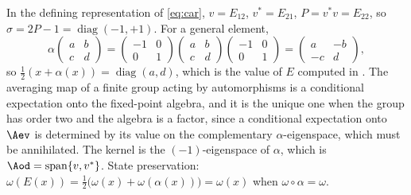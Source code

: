 In the defining representation of \eqref{eq:car}, $v = E_{12}$, $v^{*} = E_{21}$, $P = v^{*}v = E_{22}$, so $\sigma = 2P - 1 = \operatorname{diag}(-1, +1)$. For a general element,
\[
\alpha\begin{pmatrix} a & b \\ c & d \end{pmatrix}
= \begin{pmatrix} -1 & 0 \\ 0 & 1\end{pmatrix}\begin{pmatrix} a & b \\ c & d \end{pmatrix}\begin{pmatrix} -1 & 0 \\ 0 & 1\end{pmatrix}
= \begin{pmatrix} a & -b \\ -c & d \end{pmatrix},
\]
so $\tfrac12(x + \alpha(x)) = \operatorname{diag}(a,d)$, which is the value of $E$ computed in \cite[Prop.~5.5]{ButlerT5}. The averaging map of a finite group acting by automorphisms is a conditional expectation onto the fixed-point algebra, and it is the unique one when the group has order two and the algebra is a factor, since a conditional expectation onto $\Aev$ is determined by its value on the complementary $\alpha$-eigenspace, which must be annihilated. The kernel is the $(-1)$-eigenspace of $\alpha$, which is $\Aod = \operatorname{span}\{v, v^{*}\}$. State preservation: $\omega(E(x)) = \tfrac12\bigl(\omega(x) + \omega(\alpha(x))\bigr) = \omega(x)$ when $\omega \circ \alpha = \omega$.
